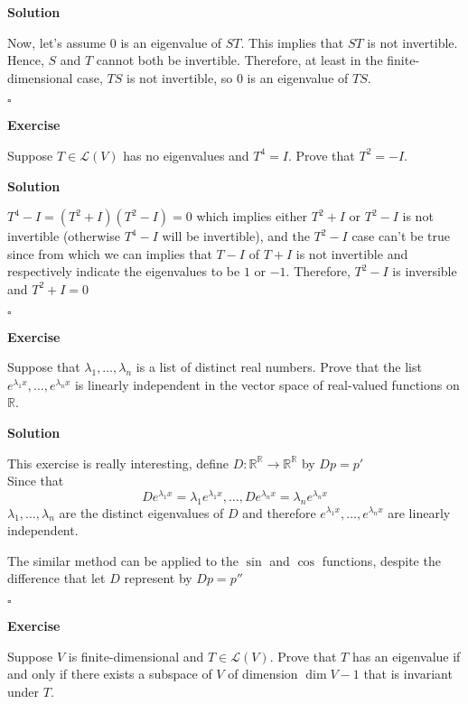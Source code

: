\documentclass{article}
\newenvironment{exercise}{%
{\textbf{Exercise\\}
    }
}{
}
\newenvironment{solution}{%
{
    \textbf{Solution\\}
    }
}{
  \hfill $\square$ 
  \par\bigskip 
}
\newcommand{\RR}{\mathbb{R}}
\begin{document}
\begin{CJK}{UTF8}{gkai}
\begin{solution}
    Now, let's assume $0$ is an eigenvalue of $ST$. This implies that $ST$ is not invertible. Hence, $S$ and $T$ cannot both be invertible. Therefore, at least in the finite-dimensional case, $TS$ is not invertible, so $0$ is an eigenvalue of $TS$.
\end{solution}

\begin{exercise}
    Suppose $T \in \mathcal{L}(V)$ has no eigenvalues and $T^4 = I$. Prove that $T^2 = -I$.
\end{exercise}

\begin{solution}
    $T^4 - I =(T^2 + I)(T^2 - I)= 0$ which implies either $T^2 + I$ or $T^2 - I$ is not invertible (otherwise $T^4 - I$ will be invertible), and the $T^2 - I$ case can't be true since from which we can implies that $T - I$ of $T + I$ is not invertible and respectively indicate the eigenvalues to be $1 $ or $-1$. Therefore, $T^2 - I$ is inversible and $T^2 + I = 0$
\end{solution}

\begin{exercise}
    Suppose that $\lambda_1,\ldots, \lambda_n$ is a list of distinct real numbers. Prove that the list $e^{\lambda_1x}, \ldots,e^{\lambda_n x}$ is linearly independent in the vector space of real-valued functions on $\RR$.
\end{exercise}

\begin{solution}
    This exercise is really interesting, define $D : \RR^{\RR} \to \RR^{\RR}$ by $D p = p'$\\
    Since that 
    \[D e^{\lambda_1x} = \lambda_1 e^{\lambda_1x},\ldots, D e^{\lambda_nx} = \lambda_n e^{\lambda_nx} \]
    $\lambda_1,\ldots,\lambda_n$ are the distinct eigenvalues of $D$ and therefore $e^{\lambda_1x}, \ldots,e^{\lambda_n x}$ are linearly independent.
    
    The similar method can be applied to the $\sin$ and $\cos $ functions, despite the difference that let $D$ represent by $Dp = p''$
\end{solution}

\begin{exercise}
    Suppose $V$ is finite-dimensional and $T \in \mathcal{L}(V)$. Prove that $T$ has an eigenvalue if and only if there exists a subspace of $V$ of dimension $\dim V - 1$ that is invariant under $T$.\\
\end{exercise}


\end{CJK}
\end{document}
